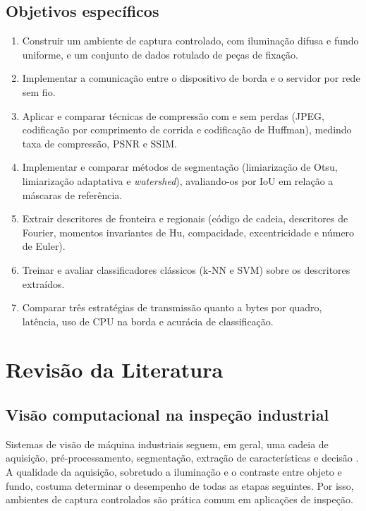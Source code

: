 \documentclass[12pt]{article}
\begin{document}
\subsection{Objetivos específicos}

\begin{enumerate}
  \item Construir um ambiente de captura controlado, com iluminação difusa e fundo uniforme, e um conjunto de dados rotulado de peças de fixação.
  \item Implementar a comunicação entre o dispositivo de borda e o servidor por rede sem fio.
  \item Aplicar e comparar técnicas de compressão com e sem perdas (JPEG, codificação por comprimento de corrida e codificação de Huffman), medindo taxa de compressão, PSNR e SSIM.
  \item Implementar e comparar métodos de segmentação (limiarização de Otsu, limiarização adaptativa e \textit{watershed}), avaliando-os por IoU em relação a máscaras de referência.
  \item Extrair descritores de fronteira e regionais (código de cadeia, descritores de Fourier, momentos invariantes de Hu, compacidade, excentricidade e número de Euler).
  \item Treinar e avaliar classificadores clássicos (k-NN e SVM) sobre os descritores extraídos.
  \item Comparar três estratégias de transmissão quanto a bytes por quadro, latência, uso de CPU na borda e acurácia de classificação.
\end{enumerate}

\section{Revisão da Literatura}
\label{sec:revisao}

\subsection{Visão computacional na inspeção industrial}

Sistemas de visão de máquina industriais seguem, em geral, uma cadeia de aquisição, pré-processamento, segmentação, extração de características e decisão \cite{golnabi2007}. A qualidade da aquisição, sobretudo a iluminação e o contraste entre objeto e fundo, costuma determinar o desempenho de todas as etapas seguintes. Por isso, ambientes de captura controlados são prática comum em aplicações de inspeção.
\end{document}
